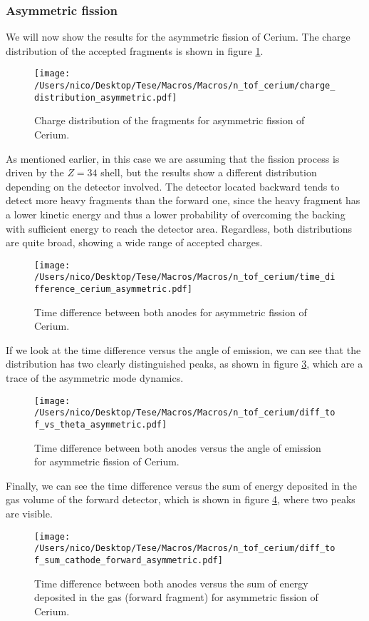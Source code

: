 \documentclass{article}
\begin{document}
\subsubsection*{Asymmetric fission}
We will now show the results for the asymmetric fission of Cerium. The charge distribution of the accepted fragments is shown in figure \ref{fig:charge_asym}.
\begin{figure}[H]
    \centering
    \texttt{[image: /Users/nico/Desktop/Tese/Macros/Macros/n\_tof\_cerium/charge\_distribution\_asymmetric.pdf]}
    \caption{Charge distribution of the fragments for asymmetric fission of Cerium.}
    \label{fig:charge_asym}
\end{figure}
As mentioned earlier, in this case we are assuming that the fission process is driven by the $Z=34$ shell, but the results show a different distribution depending on the detector involved. The detector located backward tends to detect more heavy fragments than the forward one, since the heavy fragment has a lower kinetic energy and thus a lower probability of overcoming the backing with sufficient energy to reach the detector area. Regardless, both distributions are quite broad, showing a wide range of accepted charges.
\begin{figure}[H]
    \centering
    \texttt{[image: /Users/nico/Desktop/Tese/Macros/Macros/n\_tof\_cerium/time\_difference\_cerium\_asymmetric.pdf]}
    \caption{Time difference between both anodes for asymmetric fission of Cerium.}
    \label{fig:time_diff_asym}
\end{figure}
If we look at the time difference versus the angle of emission, we can see that the distribution has two clearly distinguished peaks, as shown in figure \ref{fig:time_diff_costheta_asym}, which are a trace of the asymmetric mode dynamics.
\begin{figure}[H]
    \centering
    \texttt{[image: /Users/nico/Desktop/Tese/Macros/Macros/n\_tof\_cerium/diff\_tof\_vs\_theta\_asymmetric.pdf]}
    \caption{Time difference between both anodes versus the angle of emission for asymmetric fission of Cerium.}
    \label{fig:time_diff_costheta_asym}
\end{figure}
Finally, we can see the time difference versus the sum of energy deposited in the gas volume of the forward detector, which is shown in figure \ref{fig:time_diff_energy_asym}, where two peaks are visible.
\begin{figure}[H]
    \centering
    \texttt{[image: /Users/nico/Desktop/Tese/Macros/Macros/n\_tof\_cerium/diff\_tof\_sum\_cathode\_forward\_asymmetric.pdf]}
    \caption{Time difference between both anodes versus the sum of energy deposited in the gas (forward fragment) for asymmetric fission of Cerium.}
    \label{fig:time_diff_energy_asym}
\end{figure}
\end{document}
